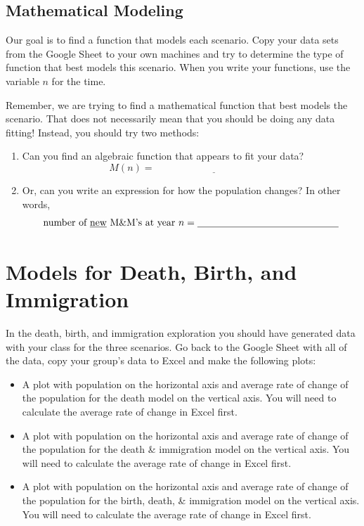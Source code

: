 \subsection*{Mathematical Modeling}
Our goal is to find a function that models each scenario. Copy your data sets from the
Google Sheet to your own machines and try to determine the type of function that best
models this scenario.  When you write your functions, use the variable $n$ for the time.  

Remember, we are trying to find a mathematical function that best models the scenario.
That does not necessarily mean that you should be doing any data fitting!  
Instead, you should try two methods:
\begin{enumerate}
    \item Can you find an algebraic function that appears to fit your data?
        \[ M(n) = \underline{\hspace{2in}} \]
    \item Or, can you write an expression for
        how the population changes? In other words,
        \[ \text{number of \underline{new} M\&M's at year $n$} = \underline{\hspace{2in}} \]
\end{enumerate}


\newpage\section{Models for Death, Birth, and Immigration}
\begin{problem}
    In the death, birth, and immigration exploration you should have generated data with your
    class for the three scenarios. Go back to the Google Sheet with all of the data, copy
    your group's data to Excel and make the following plots:
    \begin{itemize}
        \item A plot with population on the horizontal axis and average rate of change of the
            population for the death model on the vertical axis.  You will need to
            calculate the average rate of change in Excel first.
        \item A plot with population on the horizontal axis and average rate of change of the
            population for the death \& immigration model on the vertical axis.  You will need
            to calculate the average rate of change in Excel first.
        \item A plot with population on the horizontal axis and average rate of change of the
            population for the birth, death, \& immigration model on the vertical axis.  You
            will need to calculate the average rate of change in Excel first.
    \end{itemize}
\end{problem}

